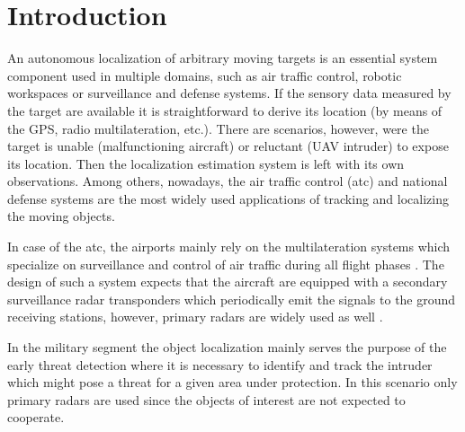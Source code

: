 

\setcounter{secnumdepth}{2}


\chapter{Introduction} \label{txt:introduction}

An autonomous localization of arbitrary moving targets is an essential system component used in multiple domains, such as air traffic control, robotic workspaces or surveillance and defense systems. If the sensory data measured by the target are available it is straightforward to derive its location (by means of the GPS, radio multilateration, etc.). There are scenarios, however, were the target is unable (malfunctioning aircraft) or reluctant (UAV intruder) to expose its location. Then the localization estimation system is left with its own observations.  Among others, nowadays, the air traffic control (\gls{atc}) and national defense systems are the most widely used applications of tracking and localizing the moving objects. 

In case of the \gls{atc}, the airports mainly rely on the multilateration systems which specialize on surveillance and control of air traffic during all flight phases \cite{Gaviria:newStrategiesMLAT}. The design of such a system expects that the aircraft are equipped with a secondary surveillance radar transponders which periodically emit the signals to the ground receiving stations, however, primary radars are widely used as well \cite{Airtrafficmuseum}. 

In the military segment the object localization mainly serves the purpose of the early threat detection where it is necessary to identify and track the intruder which might pose a threat for a given area under protection. In this scenario only primary radars are used since the objects of interest are not expected to cooperate.

